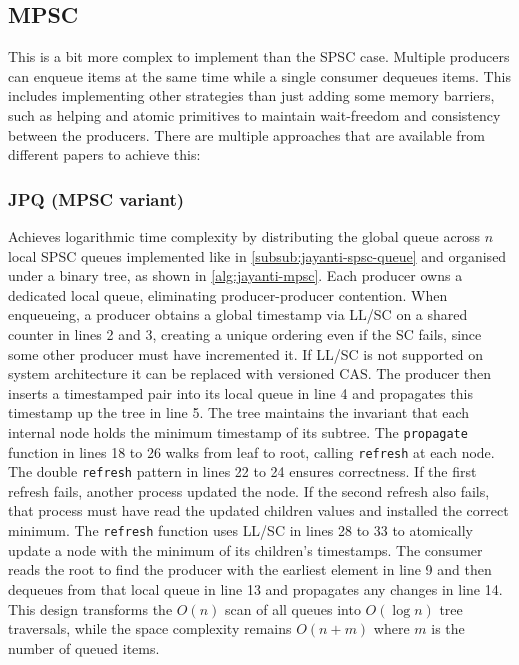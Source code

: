 \subsection{\acf{MPSC}}\label{subsec:multiple-producer-and-single-consumer}
This is a bit more complex to implement than the \ac{SPSC} case. Multiple producers can enqueue items at the same time while a single consumer dequeues items. This includes implementing other strategies than just adding some memory barriers, such as helping and atomic primitives to maintain wait-freedom and consistency between the producers. There are multiple approaches that are available from different papers to achieve this:

\subsubsection{\acf{JPQ} (\ac{MPSC} variant)}\label{subsub:jayanti-mpsc-queue}
Achieves logarithmic time complexity by distributing the global queue across $n$ local \ac{SPSC} queues implemented like in \cref{subsub:jayanti-spsc-queue} and organised under a binary tree, as shown in \cref{alg:jayanti-mpsc}. Each producer owns a dedicated local queue, eliminating producer-producer contention. When enqueueing, a producer obtains a global timestamp via \ac{LL/SC} on a shared counter in lines 2 and 3, creating a unique ordering even if the \ac{SC} fails, since some other producer must have incremented it. If \ac{LL/SC} is not supported on system architecture it can be replaced with versioned \ac{CAS}. The producer then inserts a timestamped pair into its local queue in line 4 and propagates this timestamp up the tree in line 5. The tree maintains the invariant that each internal node holds the minimum timestamp of its subtree. The \texttt{propagate} function in lines 18 to 26 walks from leaf to root, calling \texttt{refresh} at each node. The double \texttt{refresh} pattern in lines 22 to 24 ensures correctness. If the first refresh fails, another process updated the node. If the second refresh also fails, that process must have read the updated children values and installed the correct minimum. The \texttt{refresh} function uses \ac{LL/SC} in lines 28 to 33 to atomically update a node with the minimum of its children's timestamps. The consumer reads the root to find the producer with the earliest element in line 9 and then dequeues from that local queue in line 13 and propagates any changes in line 14. This design transforms the $O(n)$ scan of all queues into $O(\log n)$ tree traversals, while the space complexity remains $O(n + m)$ where $m$ is the number of queued items. \cite{JayantiLog}

